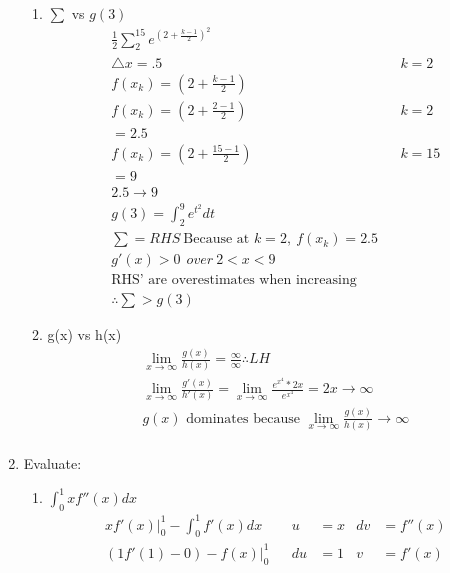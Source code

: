 \documentclass[11pt]{article}
\begin{document}
\begin{enumerate}
\begin{enumerate}
            \item $\sum$ vs $g(3)$
            \begin{align*}
                \label{eq:3d}
                \frac{1}{2}\sum_{2}^{15} e^{(2+ \frac{k-1}{2})^2} \\
                \triangle x = .5 && k = 2 \\
                f(x_{k}) = {(2+ \frac{k-1}{2})} \\
                f(x_{k}) = {(2+ \frac{2-1}{2})}&& k = 2\\
                 = 2.5 \\
                f(x_{k}) = ( 2 + \frac{15-1}{2}) && k = 15 \\
                = 9 \\
                2.5 \to 9\\
                g(3) = \int_{2}^{9} e^{t^2}dt \\
                \sum = RHS\ \text{Because at $k=2,\ f(x_{k}) = 2.5  $}\\
                g'(x) > 0\ \ over\ 2 < x < 9 \\
                \text{RHS' are overestimates when increasing} \\
                \therefore  \sum > g(3)
            \end{align*}
            \item g(x) vs h(x)
            \begin{align*}
                \label{eq:3e}
                \lim_{x\to\infty} \frac{g(x)}{h(x)} = \frac{\infty}{\infty} \therefore LH\\
                \lim_{x\to\infty} \frac{g'(x)}{h'(x)} = \lim_{x\to\infty}\frac{e^{x^4}*2x}{e^{x^4}} = 2x \to \infty \\
                \text{$g(x)$ dominates because $\lim_{x\to\infty}\frac{g(x)}{h(x)} \to \infty$}
                \\
            \end{align*}
        \end{enumerate}
        \item Evaluate:
        \begin{enumerate}
            \item \Large$\int_{0}^{1}xf''(x)dx $\label{q:4a}
            \begin{align*}
                \label{eq:4a}
                xf'(x)\big\vert_{0}^{1} - \int_{0}^{1}f'(x)dx && u &= x & dv &= f''(x) \\
                (1f'(1) - 0) - f(x)\big\vert_{0}^{1}&& du &= 1 & v &= f'(x) \\

\end{align*}
\end{enumerate}
\end{enumerate}
\end{document}
